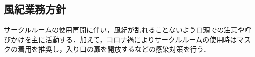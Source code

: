 \subsection*{風紀業務方針}

サークルルームの使用再開に伴い，風紀が乱れることないよう口頭での注意や呼びかけを主に活動する．加えて，コロナ禍によりサークルルームの使用時はマスクの着用を推奨し，入り口の扉を開放するなどの感染対策を行う．



